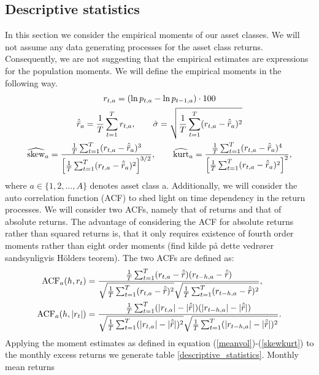 \documentclass[11pt,a4paper,oneside]{article}
\newcommand{\rb}{\right]}
\newcommand{\lb}{\left[}
\begin{document}
\subsection{Descriptive statistics}\label{descriptivesection}
\noindent In this section we consider the empirical moments of our asset classes. We will not assume any data generating processes for the asset class returns. Consequently, we are not suggesting that the empirical estimates are expressions for the population moments. We will define the empirical moments in the following way.
\vspace{-7mm}
\begin{gather}
    r_{t,a}=(\ln{p_{t,a}}-\ln{p_{t-1,a}})\cdot 100
    \\
    \hat{\Bar{r}}_a=\frac{1}{T}\sum_{t=1}^{T}r_{t,a}, \qquad \hat{\sigma}= \sqrt{\frac{1}{T}\sum_{t=1}^{T}(r_{t,a}-\hat{\Bar{r}}_a)^2} \label{meanvol} \\ 
    \widehat{\text{skew}}_a=\frac{\frac{1}{T}\sum_{t=1}^{T}(r_{t,a}-\hat{\Bar{r}}_a)^3}{\lb\frac{1}{T}\sum_{t=1}^{T}(r_{t,a}-\hat{\Bar{r}}_a)^2\rb^{3/2}}
    , \qquad \widehat{\text{kurt}}_a=\frac{\frac{1}{T}\sum_{t=1}^{T}(r_{t,a}-\hat{\Bar{r}}_a)^4}{\lb\frac{1}{T}\sum_{t=1}^{T}(r_{t,a}-\hat{\Bar{r}}_a)^2\rb^{2}} \label{skewkurt},
\end{gather}
where $a \in \{1,2,...,A\}$ denotes asset class a. Additionally, we will consider the auto correlation function (ACF) to shed light on time dependency in the return processes. We will consider two ACFs, namely that of returns and that of absolute returns. The advantage of considering the ACF for absolute returns rather than squared returns is, that it only requires existence of fourth order moments rather than eight order moments (find kilde på dette vedrører sandsynligvis Hölders teorem). The two ACFs are defined as:
\begin{align}
    \text{ACF}_a(h,r_t)&= \frac{\frac{1}{T}\sum_{t=1}^{T}(r_{t,a}-\hat{\Bar{r}})(r_{t-h,a}-\hat{\Bar{r}})}{\sqrt{\frac{1}{T}\sum_{t=1}^{T}(r_{t,a}-\hat{\Bar{r}})^2}\sqrt{\frac{1}{T}\sum_{t=1}^{T}(r_{t-h,a}-\hat{\Bar{r}})^2}} \label{acf} ,  \\
    \text{ACF}_a(h,\vert {r_t} \vert) &= \frac{\frac{1}{T}\sum_{t=1}^{T}(\vert r_{t,a} \vert-\vert\hat{\Bar{r}}\vert)(\vert r_{t-h,a}\vert-\vert\hat{\Bar{r}}\vert)}{\sqrt{\frac{1}{T}\sum_{t=1}^{T}(\vert r_{t,a}\vert-\vert\hat{\Bar{r}}\vert)^2}\sqrt{\frac{1}{T}\sum_{t=1}^{T}(\vert r_{t-h,a}\vert-\vert\hat{\Bar{r}}\vert)^2}} \label{acfabs}. 
\end{align}
Applying the moment estimates as defined in equation (\ref{meanvol})-(\ref{skewkurt}) to the monthly excess returns we generate table \ref{descriptive_statistics}. Monthly mean returns 
\end{document}
